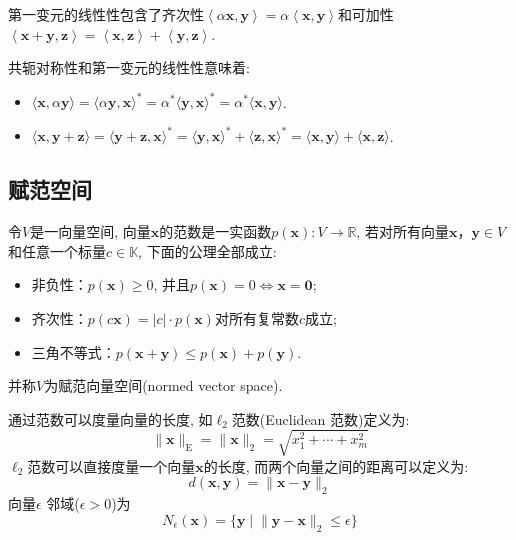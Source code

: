 \documentclass[lang=cn,10pt]{gorgeousnbook}
\numberwithin{equation}{section}%
\numberwithin{figure}{section}%
\begin{document}
\begin{note}
第一变元的线性性包含了齐次性$\left< \alpha \boldsymbol{x},\boldsymbol{y} \right> =\alpha \left< \boldsymbol{x},\boldsymbol{y} \right> $和可加性$\left< \boldsymbol{x}+\boldsymbol{y},\boldsymbol{z} \right> =\left< \boldsymbol{x},\boldsymbol{z} \right> +\left< \boldsymbol{y},\boldsymbol{z} \right> 
$.
\end{note}

\begin{note}
共轭对称性和第一变元的线性性意味着:
\begin{itemize}
\item $\langle\boldsymbol{x},\alpha\boldsymbol{y}\rangle=\langle\alpha\boldsymbol{y},\boldsymbol{x}\rangle^*=\alpha^*\langle\boldsymbol{y},\boldsymbol{x}\rangle^*=\alpha^*\langle\boldsymbol{x},\boldsymbol{y}\rangle $.
\item $\langle \boldsymbol{x},\boldsymbol{y}+\boldsymbol{z}\rangle=\langle\boldsymbol{y}+\boldsymbol{z},\boldsymbol{x}\rangle^*=\langle\boldsymbol{y},\boldsymbol{x}\rangle^*+\langle\boldsymbol{z},\boldsymbol{x}\rangle^*=\langle\boldsymbol{x},\boldsymbol{y}\rangle+\langle\boldsymbol{x},\boldsymbol{z}\rangle $.
\end{itemize}
\end{note}
\subsection{赋范空间}
\begin{definition}[范数和赋范向量空间]
令$V$是一向量空间, 向量$\bm{x}$的范数是一实函数$p\left(\bm{x}\right):V\rightarrow \mathbb{R}$, 若对所有向量$\bm{x}，\bm{y}\in V$和任意一个标量$c\in\mathbb{K}$, 下面的公理全部成立:
\begin{itemize}
\item 非负性：$p(\boldsymbol{x})\geqslant0$, 并且$p(\boldsymbol{x})=0\Leftrightarrow\boldsymbol{x}=\boldsymbol{0}$;
\item 齐次性：$p(c\boldsymbol{x})=|c|\cdot p(\boldsymbol{x})$对所有复常数$c$成立; 
\item 三角不等式：$p(\boldsymbol{x}+\boldsymbol{y})\leqslant p(\boldsymbol{x})+p(\boldsymbol{y})$.
\end{itemize}
并称$V$为赋范向量空间(normed vector space). 
\end{definition}
通过范数可以度量向量的长度, 如$\ell_2$范数(Euclidean 范数)定义为:
\begin{equation}
\|\boldsymbol{x}\|_{\mathrm{E}}=\|\boldsymbol{x}\|_2=\sqrt{x_1^2+\cdots+x_m^2}
\end{equation}
$\ell_2$范数可以直接度量一个向量$\bm{x}$的长度, 而两个向量之间的距离可以定义为:
\begin{equation}
d(\boldsymbol{x},\boldsymbol{y})=\|\boldsymbol{x}-\boldsymbol{y}\|_2
\end{equation}
向量$\epsilon $ 邻域($\epsilon>0 $)为
\begin{equation}
N_\epsilon(\boldsymbol{x})=\{\boldsymbol{y}\mid\lVert\boldsymbol{y}-\boldsymbol{x}\rVert_2\leqslant\epsilon\}
\end{equation}
\end{document}
